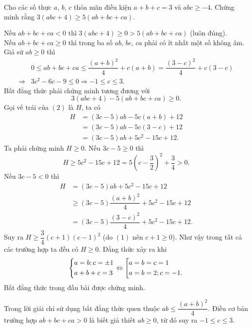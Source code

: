 \begin{bt}%
	Cho các số thực $a$, $b$, $c$ thỏa mãn điều kiện $a+b+c=3$ và $abc\ge -4$. Chứng minh rằng $3(abc+4)\ge 5(ab+bc+ca)$.
\loigiai
{
Nếu $ab+bc+ca<0$ thì 
$3(abc+4)\ge 0> 5(ab+bc+ca)$ (luôn đúng).\\
Nếu $ab+bc+ca\ge 0$ thì trong ba số $ab$, $bc$, $ca$ phải có ít nhất một số không âm. Giả sử $ab\ge 0$ thì 
{\allowdisplaybreaks
\begin{align*}
&0\le ab+bc+ca\le \dfrac{(a+b)^2}{4}+c(a+b)=\dfrac{(3-c)^2}{4}+c(3-c)\\
\Rightarrow&3c^2-6c-9\le 0\Rightarrow -1\le c\le 3.\tag{1}
\end{align*}}Bất đẳng thức phải chứng minh tương đương với 
\[3(abc+4)-5(ab+bc+ca)\ge 0.\tag{2}\]
Gọi vế trái của $(2)$ là $H$, ta có 
{\allowdisplaybreaks
\begin{align*}
H&=(3c-5)ab-5c(a+b)+12\\
&=(3c-5)ab-5c(3-c)+12\\
&=(3c-5)ab+5c^2-15c+12.
\end{align*}}Ta phải chứng minh $H\ge 0$.
Nếu $3c-5\ge 0$ thì 
\[H\ge 5c^2-15c+12=5\left(c-\dfrac{3}{2}\right)^2+\dfrac{3}{4}>0.\]
Nếu $3c-5<0$ thì
{\allowdisplaybreaks
\begin{align*}
H&=(3c-5)ab+5c^2-15c+12\\
&\ge (3c-5)\dfrac{(a+b)^2}{4}+5c^2-15c+12\\
&=(3c-5)\dfrac{(3-c)^2}{4}+5c^2-15c+12.
\end{align*}}Suy ra $H\ge \dfrac{3}{4}(c+1)(c-1)^2$ (do $(1)$ nên $c+1\ge 0$).
Như vậy trong tất cả các trường hợp ta đều có $H\ge 0$.
Đẳng thức xảy ra khi 
\[\left\{\begin{aligned}&a=b; c=\pm 1\\ &a+b+c=3\end{aligned}\right.\Leftrightarrow \left[\begin{aligned}&a=b=c=1\\ &a=b=2; c=-1.\end{aligned}\right.\]
Bất đẳng thức trong đầu bài được chứng minh.
\begin{nx}
	Trong lời giải chỉ sử dụng bất đẳng thức quen thuộc $ab\le \dfrac{(a+b)^2}{4}$. Điều cơ bản trường hợp $ab+bc+ca>0$ là biết giả thiết $ab\ge 0$, từ đó suy ra $-1\le c\le 3$.
\end{nx}
}
\end{bt}

